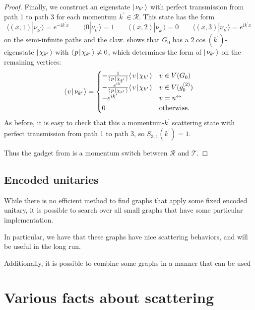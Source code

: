 \documentclass[../thesis-main/thesis-main]{subfiles}
\begin{document}
\begin{proof}
Finally, we construct an eigenstate $|\mspace{2mu} \nu_{k^\prime} \mspace{2mu} \rangle$ with perfect transmission from path 1 to path 3 for each momentum $k^\prime \in \mathcal{R}$.  This state has the form
\[
  \langle (x,1)|\nu_{k^\prime}\rangle=e^{-i k^\prime x} \qquad 
  \langle 0|\nu_{k^\prime}\rangle=1 \qquad 
  \langle (x,2)|\nu_{k^\prime}\rangle=0 \qquad
  \langle (x,3)|\nu_{k^\prime}\rangle=e^{i k^\prime x}
\]
on the semi-infinite paths and the claw.   shows that $G_0$ has a $2\cos(k^\prime)$-eigenstate $|\mspace{2mu} \chi_{k^\prime} \mspace{2mu} \rangle$ with $\langle\mspace{2mu} p \mspace{2mu} | \mspace{2mu} \chi_{k'}\mspace{2mu} \rangle \ne 0$, which determines the form of $|\mspace{2mu} \nu_{k^\prime} \mspace{2mu} \rangle$ on the remaining vertices:
\[
  \langle\mspace{2mu} v \mspace{2mu} | \mspace{2mu} \nu_{k^\prime}\mspace{2mu} \rangle =
  \begin{cases}
	  -\frac{1}{\langle\mspace{2mu} p \mspace{2mu} | \mspace{2mu} \chi_{k'}\mspace{2mu} \rangle} \langle\mspace{2mu} v \mspace{2mu} | \mspace{2mu} \chi_{k^\prime}\mspace{2mu} \rangle & v \in V(G_0) \\
	  -\frac{e^{ik'}}{\langle\mspace{2mu} p \mspace{2mu} | \mspace{2mu} \chi_{k'}\mspace{2mu} \rangle} \langle\mspace{2mu} v \mspace{2mu} | \mspace{2mu} \chi_{k^\prime}\mspace{2mu} \rangle & v \in V(g_0^{(2)}) \\
	  -e^{ik'} & v=u^\leftrightarrow \\
    0 & \text{otherwise}.
  \end{cases} 
\]
As before, it is easy to check that this a momentum-$k^\prime$ scattering state with perfect transmission from path 1 to path 3, so $S_{3,1}(k^\prime)=1$.

Thus the gadget from  is a momentum switch between $\mathcal{R}$ and $\mathcal{T}$.
\end{proof}



\subsection{Encoded unitaries}

While there is no efficient method to find graphs that apply some fixed encoded unitary, it is possible to search over all small graphs that have some particular implementation.


In particular, we have that these graphs have nice scattering behaviors, and will be useful in the long run.

Additionally, it is possible to combine some graphs in a manner that can be used 


\section{Various facts about scattering}
\end{document}
